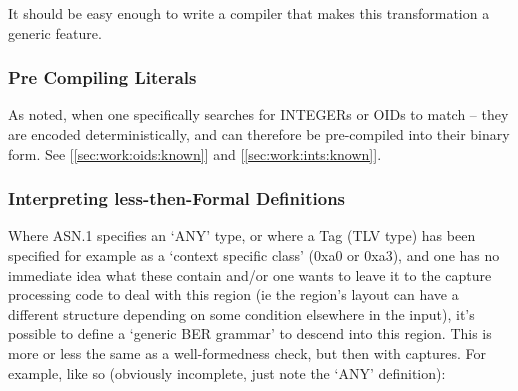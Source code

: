 It should be easy enough to write a compiler that makes this 
transformation a generic feature.

\subsubsection{Pre Compiling Literals}
As noted, when one specifically searches for INTEGERs or OIDs to match – 
they are encoded deterministically, and can therefore be pre-compiled into 
their binary form. See [\ref{sec:work:oids:known}]
and [\ref{sec:work:ints:known}].

\subsubsection{Interpreting less-then-Formal Definitions }
Where ASN.1 specifies an ‘ANY’ type, or where a Tag (TLV type) has 
been specified for example as a ‘context specific class’ (0xa0 or 
0xa3), and one has no immediate idea what these contain and/or one wants 
to leave it to the capture processing code to deal with this region (ie 
the region’s layout can have a different structure depending on some 
condition elsewhere in the input), it’s possible to define a ‘generic 
BER grammar’ to descend into this region. This is more or less the same 
as a well-formedness check, but then with captures. For example, like so 
(obviously incomplete, just note the ‘ANY’ definition):

